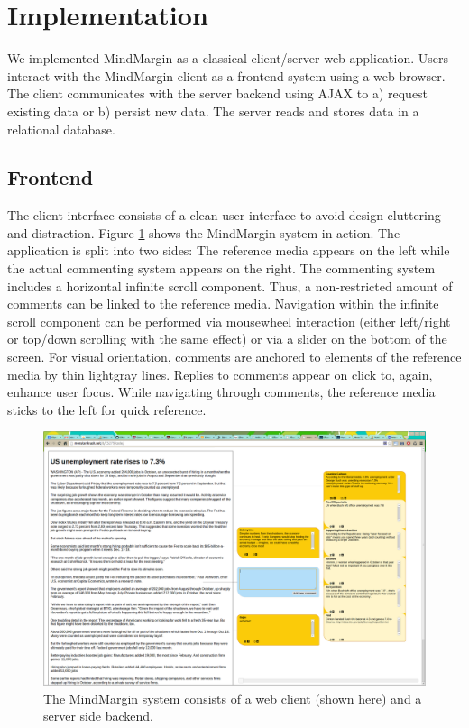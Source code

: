 \section {Implementation}

We implemented MindMargin as a classical client/server web-application. Users interact with the MindMargin client as a frontend system using a web browser. The client communicates with the server backend using AJAX to a) request existing data or b) persist new data. The server reads and stores data in a relational database.

\subsection{Frontend}
The client interface consists of a clean user interface to avoid design cluttering and distraction. Figure \ref{fig:frontend} shows the MindMargin system in action. The application is split into two sides: The reference media appears on the left while the actual commenting system appears on the right. The commenting system includes a horizontal infinite scroll component. Thus, a non-restricted amount of comments can be linked to the reference media. Navigation within the infinite scroll component can be performed via mousewheel interaction (either left/right or top/down scrolling with the same effect) or via a slider on the bottom of the screen. For visual orientation, comments are anchored to elements of the reference media by thin lightgray lines. Replies to comments appear on click to, again, enhance user focus. While navigating through comments, the reference media sticks to the left for quick reference.

\begin{figure}
\includegraphics[scale=0.13]{mindmargin.png} 
\caption{The MindMargin system consists of a web client (shown here) and a server side backend.}
\label{fig:frontend}
\end{figure}



